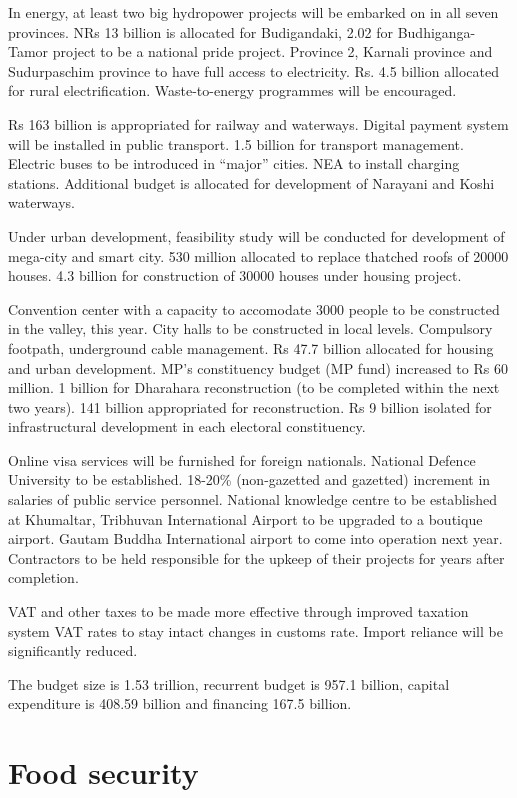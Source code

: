 \documentclass[
  openany]{book}
\begin{document}
In energy, at least two big hydropower projects will be embarked on in all seven provinces. NRs 13 billion is allocated for Budigandaki, 2.02 for Budhiganga-Tamor project to be a national pride project. Province 2, Karnali province and Sudurpaschim province to have full access to electricity. Rs. 4.5 billion allocated for rural electrification. Waste-to-energy programmes will be encouraged.

Rs 163 billion is appropriated for railway and waterways. Digital payment system will be installed in public transport. 1.5 billion for transport management. Electric buses to be introduced in ``major'' cities. NEA to install charging stations. Additional budget is allocated for development of Narayani and Koshi waterways.

Under urban development, feasibility study will be conducted for development of mega-city and smart city. 530 million allocated to replace thatched roofs of 20000 houses. 4.3 billion for construction of 30000 houses under housing project.

Convention center with a capacity to accomodate 3000 people to be constructed in the valley, this year. City halls to be constructed in local levels. Compulsory footpath, underground cable management. Rs 47.7 billion allocated for housing and urban development. MP's constituency budget (MP fund) increased to Rs 60 million. 1 billion for Dharahara reconstruction (to be completed within the next two years). 141 billion appropriated for reconstruction. Rs 9 billion isolated for infrastructural development in each electoral constituency.

Online visa services will be furnished for foreign nationals. National Defence University to be established. 18-20\% (non-gazetted and gazetted) increment in salaries of public service personnel. National knowledge centre to be established at Khumaltar, Tribhuvan International Airport to be upgraded to a boutique airport. Gautam Buddha International airport to come into operation next year. Contractors to be held responsible for the upkeep of their projects for years after completion.

VAT and other taxes to be made more effective through improved taxation system VAT rates to stay intact changes in customs rate. Import reliance will be significantly reduced.

The budget size is 1.53 trillion, recurrent budget is 957.1 billion, capital expenditure is 408.59 billion and financing 167.5 billion.

\hypertarget{food-security}{%
\section{Food security}\label{food-security}}
\end{document}
